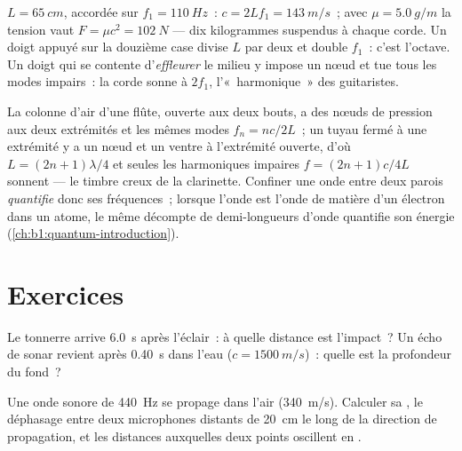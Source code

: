 \begin{example}\label{ex:b1:wave-propagation:guitar}
$L = \qty{65}{cm}$, accordée sur $f_1 = \qty{110}{Hz}$~: $c = 2Lf_1 =
\qty{143}{m/s}$~; avec $\mu = \qty{5.0}{g/m}$ la tension vaut $F = \mu c^2
= \qty{102}{N}$ --- dix kilogrammes suspendus à chaque corde. Un doigt
appuyé sur la douzième case divise $L$ par deux et double $f_1$~: c'est
l'octave. Un doigt qui se contente d'\emph{effleurer} le milieu y impose
un nœud et tue tous les modes impairs~: la corde sonne à $2f_1$, l'«~harmonique~»
des guitaristes.
\end{example}

\begin{remark}\label{rem:b1:wave-propagation:pipes}
La colonne d'air d'une flûte, ouverte aux deux bouts, a des nœuds de
pression aux deux extrémités et les mêmes modes $f_n = nc/2L$~; un tuyau
fermé à une extrémité y a un nœud et un ventre à l'extrémité ouverte,
d'où $L = (2n + 1)\lambda/4$ et seules les harmoniques impaires
$f = (2n + 1)c/4L$ sonnent --- le timbre creux de la clarinette.
Confiner une onde entre deux parois \emph{quantifie} donc ses
fréquences~; lorsque l'onde est l'onde de matière d'un électron dans un
atome, le même décompte de demi-longueurs d'onde quantifie son énergie
(\cref{ch:b1:quantum-introduction}).
\end{remark}

\section{Exercices}

\begin{exercise}[$\star$]\label{exo:b1:wave-propagation:1}
Le tonnerre arrive \qty{6.0}{s} après l'éclair~: à quelle distance est
l'impact~? Un écho de sonar revient après \qty{0.40}{s} dans l'eau
($c = \qty{1500}{m/s}$)~: quelle est la profondeur du fond~?
\end{exercise}

\begin{exercise}[$\star$]\label{exo:b1:wave-propagation:2}
Une onde sonore de \qty{440}{Hz} se propage dans l'air (\qty{340}{m/s}).
Calculer sa , le déphasage entre deux microphones
distants de \qty{20}{cm} le long de la direction de propagation, et les
distances auxquelles deux points oscillent en .
\end{exercise}

